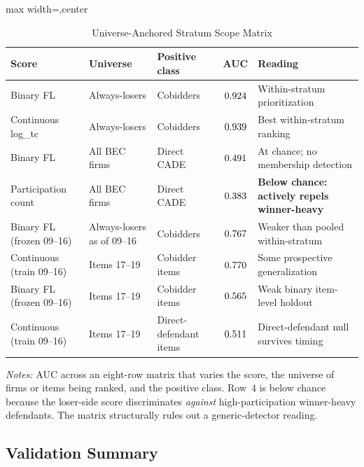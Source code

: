 \begin{table}[htbp]
\centering
\caption{Universe-Anchored Stratum Scope Matrix}
\label{tab:scope_matrix_submission}
\footnotesize
\begin{adjustbox}{max width=\textwidth,center}
\begin{threeparttable}
\begin{tabular}{p{3.3cm}p{3.0cm}p{3.0cm}cp{4.0cm}}
\toprule
Score & Universe & Positive class & AUC & Reading \\
\midrule
Binary FL & Always-losers & Cobidders & $0.924$
  & Within-stratum prioritization \\
Continuous log\_tc & Always-losers & Cobidders & $0.939$
  & Best within-stratum ranking \\
Binary FL & All BEC firms & Direct CADE & $0.491$
  & At chance; no membership detection \\
Participation count & All BEC firms & Direct CADE & $0.383$
  & \textbf{Below chance: actively repels winner-heavy} \\
Binary FL (frozen 09--16) & Always-losers as of 09--16 & Cobidders
  & $0.767$ & Weaker than pooled within-stratum \\
Continuous (train 09--16) & Items 17--19 & Cobidder items
  & $0.770$ & Some prospective generalization \\
Binary FL (frozen 09--16) & Items 17--19 & Cobidder items
  & $0.565$ & Weak binary item-level holdout \\
Continuous (train 09--16) & Items 17--19 & Direct-defendant items
  & $0.511$ & Direct-defendant null survives timing \\
\bottomrule
\end{tabular}
\begin{tablenotes}
\footnotesize
\item \textit{Notes:} AUC across an eight-row matrix that varies the
score, the universe of firms or items being ranked, and the positive
class. Row~4 is below chance because the loser-side score
discriminates \emph{against} high-participation winner-heavy
defendants. The matrix structurally rules out a generic-detector
reading.
\end{tablenotes}
\end{threeparttable}
\end{adjustbox}
\end{table}

\subsection{Validation Summary}
\label{sec:validation_summary}

